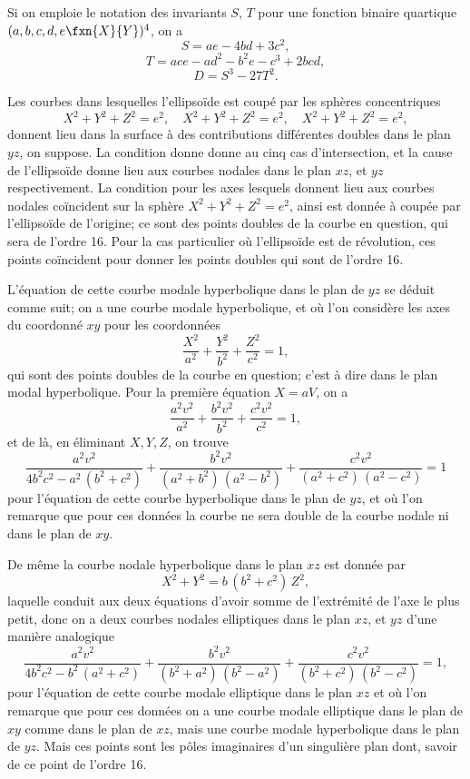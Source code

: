 \documentclass[11pt,a4paper]{book}
\begin{document}
Si on emploie le notation des invariants $S$, $T$ pour une fonction binaire quartique $(a, b, c, d, e\,\!\fxn{X}{Y})^4$, on a
\[
S = ae - 4bd + 3c^2,
\]
\[
T = ace - ad^2 - b^2e - c^3 + 2bcd,
\]
\[
D = S^3 - 27T^2.
\]

\setcounter{page}{128}

Les courbes dans lesquelles l'ellipsoïde est coupé par les sphères concentriques
\[
X^2 + Y^2 + Z^2 = e^2,\quad X^2 + Y^2 + Z^2 = e^2,\quad X^2 + Y^2 + Z^2 = e^2,
\]
donnent lieu dans la surface à des contributions différentes doubles dans le plan $yz$, on suppose. La condition donne donne au cinq cas d'intersection, et la cause de l'ellipsoïde donne lieu aux courbes nodales dans le plan $xz$, et $yz$ respectivement. La condition pour les axes lesquels donnent lieu aux courbes nodales coïncident sur la sphère $X^2 + Y^2 + Z^2 = e^2$, ainsi est donnée à coupée par l'ellipsoïde de l'origine; ce sont des points doubles de la courbe en question, qui sera de l'ordre 16. Pour la cas particulier où l'ellipsoïde est de révolution, ces points coïncident pour donner les points doubles qui sont de l'ordre 16.

L'équation de cette courbe modale hyperbolique dans le plan de $yz$ se déduit comme suit; on a une courbe modale hyperbolique, et où l'on considère les axes du coordonné $xy$ pour les coordonnées
\[
\frac{X^2}{a^2} + \frac{Y^2}{b^2} + \frac{Z^2}{c^2} = 1,
\]
qui sont des points doubles de la courbe en question; c'est à dire dans le plan modal hyperbolique. Pour la première équation $X = aV$, on a
\[
\frac{a^2v^2}{a^2} + \frac{b^2v^2}{b^2} + \frac{c^2v^2}{c^2} = 1,
\]
et de là, en éliminant $X, Y, Z$, on trouve
\[
\frac{a^2 v^2}{4b^2c^2 - a^2\,(b^2+c^2)} + \frac{b^2v^2}{(a^2+b^2)\,(a^2-b^2)} + \frac{c^2v^2}{(a^2+c^2)\,(a^2-c^2)} = 1
\]
pour l'équation de cette courbe hyperbolique dans le plan de $yz$, et où l'on remarque que pour ces données la courbe ne sera double de la courbe nodale ni dans le plan de $xy$.

De même la courbe nodale hyperbolique dans le plan $xz$ est donnée par
\[
X^2 + Y^2 = b\,(b^2+c^2)\,Z^2,
\]
laquelle conduit aux deux équations d'avoir somme de l'extrémité de l'axe le plus petit, donc on a deux courbes nodales elliptiques dans le plan $xz$, et $yz$ d'une manière analogique
\[
\frac{a^2v^2}{4b^2c^2 - b^2\,(a^2+c^2)} + \frac{b^2v^2}{(b^2+a^2)\,(b^2-a^2)} + \frac{c^2v^2}{(b^2+c^2)\,(b^2-c^2)} = 1,
\]
pour l'équation de cette courbe modale elliptique dans le plan $xz$ et où l'on remarque que pour ces données on a une courbe modale elliptique dans le plan de $xy$ comme dans le plan de $xz$, mais une courbe modale hyperbolique dans le plan de $yz$. Mais ces points sont les pôles imaginaires d'un singulière plan dont, savoir de ce point de l'ordre 16.
\end{document}
